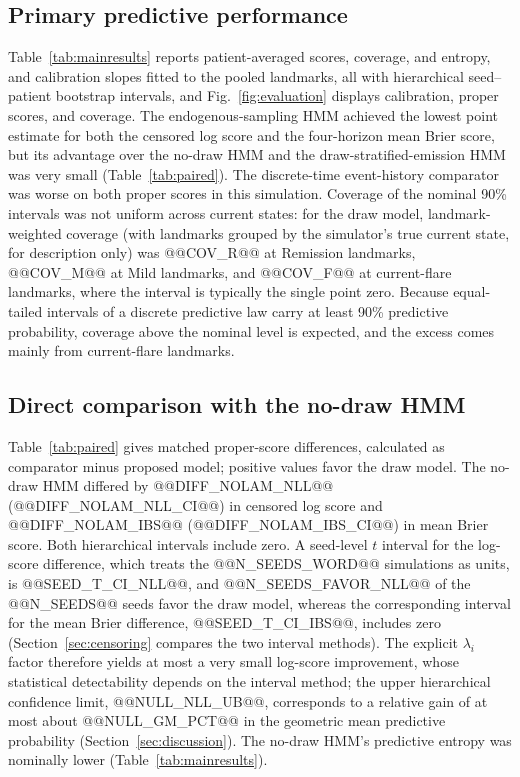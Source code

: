 \documentclass{ieeeaccess}
\begin{document}
\subsection{Primary predictive performance}\label{sec:primary}
Table~\ref{tab:mainresults} reports patient-averaged scores, coverage, and entropy, and calibration slopes fitted to the pooled landmarks, all with hierarchical seed--patient bootstrap intervals, and Fig.~\ref{fig:evaluation} displays calibration, proper scores, and coverage. The endogenous-sampling HMM achieved the lowest point estimate for both the censored log score and the four-horizon mean Brier score, but its advantage over the no-draw HMM and the draw-stratified-emission HMM was very small (Table~\ref{tab:paired}). The discrete-time event-history comparator was worse on both proper scores in this simulation. Coverage of the nominal 90\% intervals was not uniform across current states: for the draw model, landmark-weighted coverage (with landmarks grouped by the simulator's true current state, for description only) was @@COV_R@@ at Remission landmarks, @@COV_M@@ at Mild landmarks, and @@COV_F@@ at current-flare landmarks, where the interval is typically the single point zero. Because equal-tailed intervals of a discrete predictive law carry at least 90\% predictive probability, coverage above the nominal level is expected, and the excess comes mainly from current-flare landmarks.



\subsection{Direct comparison with the no-draw HMM}\label{sec:direct}
Table~\ref{tab:paired} gives matched proper-score differences, calculated as comparator minus proposed model; positive values favor the draw model. The no-draw HMM differed by @@DIFF_NOLAM_NLL@@ (@@DIFF_NOLAM_NLL_CI@@) in censored log score and @@DIFF_NOLAM_IBS@@ (@@DIFF_NOLAM_IBS_CI@@) in mean Brier score. Both hierarchical intervals include zero. A seed-level $t$ interval for the log-score difference, which treats the @@N_SEEDS_WORD@@ simulations as units, is @@SEED_T_CI_NLL@@, and @@N_SEEDS_FAVOR_NLL@@ of the @@N_SEEDS@@ seeds favor the draw model, whereas the corresponding interval for the mean Brier difference, @@SEED_T_CI_IBS@@, includes zero (Section~\ref{sec:censoring} compares the two interval methods). The explicit $\lambda_i$ factor therefore yields at most a very small log-score improvement, whose statistical detectability depends on the interval method; the upper hierarchical confidence limit, @@NULL_NLL_UB@@, corresponds to a relative gain of at most about @@NULL_GM_PCT@@ in the geometric mean predictive probability (Section~\ref{sec:discussion}). The no-draw HMM's predictive entropy was nominally lower (Table~\ref{tab:mainresults}).
\end{document}
